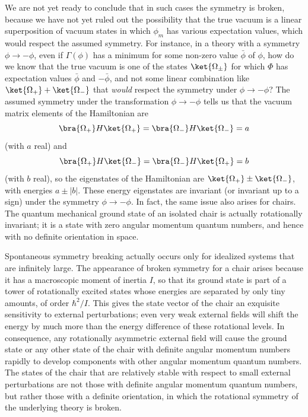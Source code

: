We are not yet ready to conclude that in such cases the symmetry is broken,
because we have not yet ruled out the possibility that the true vacuum is a
linear superposition of vacuum states in which $\phi_m$ has various
expectation values, which would respect the assumed symmetry. For instance,
in a theory with a symmetry $\phi\to-\phi$, even if $\Gamma(\phi)$ has a
minimum for some non-zero value $\bar\phi$ of $\phi$, how do we know that the
true vacuum is one of the states $\ket{\Omega_\pm}$ for which $\Phi$ has
expectation values $\bar\phi$ and $-\bar\phi$, and not some linear combination
like $\ket{\Omega_+}+\ket{\Omega_-}$ that \emph{would} respect the symmetry
under $\phi\to-\phi$? The assumed symmetry under the transformation
$\phi\to-\phi$ tells us that the vacuum matrix elements of the Hamiltonian
are
\[
 \bra{\Omega_+}H\ket{\Omega_+}
 =\bra{\Omega_-}H\ket{\Omega_-}=a
\]
(with $a$ real) and
\[
 \bra{\Omega_+}H\ket{\Omega_-}
 =\bra{\Omega_-}H\ket{\Omega_+}=b
\]
(with $b$ real), so the eigenstates of the Hamiltonian are
$\ket{\Omega_+}\pm\ket{\Omega_-}$, with energies $a\pm\lvert b\rvert$.
These energy eigenstates are invariant (or invariant up to a sign) under the
symmetry $\phi\to-\phi$. In fact, the same issue also arises for chairs. The
quantum mechanical ground state of an isolated chair is actually rotationally
invariant; it is a state with zero angular momentum quantum numbers, and
hence with no definite orientation in space.

Spontaneous symmetry breaking actually occurs only for idealized systems that
are infinitely large. The appearance of broken symmetry for a chair arises
because it has a macroscopic moment of inertia $I$, so that its ground state
is part of a tower of rotationally excited states whose energies are
separated by only tiny amounts, of order $\hbar^2/I$. This gives the state
vector of the chair an exquisite sensitivity to external perturbations; even
very weak external fields will shift the energy by much more than the energy
difference of these rotational levels. In consequence, any rotationally
asymmetric external field will cause the ground state or any other state of
the chair with definite angular momentum numbers rapidly to develop
components with other angular momentum quantum numbers. The states of the
chair that are relatively stable with respect to small external perturbations
are not those with definite angular momentum quantum numbers, but rather
those with a definite orientation, in which the rotational symmetry of the
underlying theory is broken.

